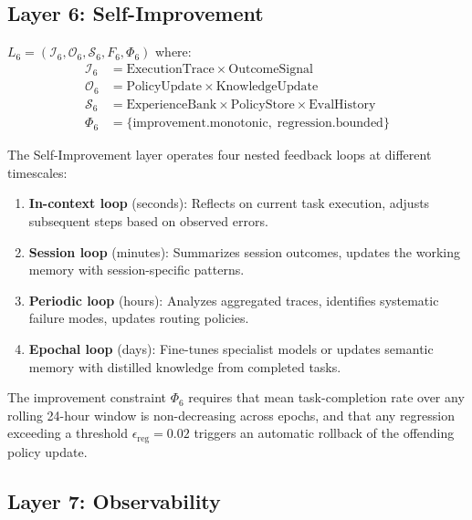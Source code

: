 \subsection{Layer 6: Self-Improvement}

\begin{definition}
    $L_6 = \left(\mathcal{I}_6, \mathcal{O}_6, \mathcal{S}_6, F_6, \Phi_6\right)$ where:
    \begin{align*}
        \mathcal{I}_6 &= \text{ExecutionTrace} \times \text{OutcomeSignal} \\
        \mathcal{O}_6 &= \text{PolicyUpdate} \times \text{KnowledgeUpdate} \\
        \mathcal{S}_6 &= \text{ExperienceBank} \times \text{PolicyStore} \times
                         \text{EvalHistory} \\
        \Phi_6 &= \{\text{improvement.monotonic},\;
                    \text{regression.bounded}\}
    \end{align*}
\end{definition}

The Self-Improvement layer operates four nested feedback loops at different
timescales:

\begin{enumerate}[leftmargin=1.5em]
    \item \textbf{In-context loop} (seconds): Reflects on current task
          execution, adjusts subsequent steps based on observed errors.
    \item \textbf{Session loop} (minutes): Summarizes session outcomes,
          updates the working memory with session-specific patterns.
    \item \textbf{Periodic loop} (hours): Analyzes aggregated traces,
          identifies systematic failure modes, updates routing policies.
    \item \textbf{Epochal loop} (days): Fine-tunes specialist models or
          updates semantic memory with distilled knowledge from completed tasks.
\end{enumerate}

The improvement constraint $\Phi_6$ requires that mean task-completion rate
over any rolling 24-hour window is non-decreasing across epochs, and that any
regression exceeding a threshold $\epsilon_{\text{reg}} = 0.02$ triggers an
automatic rollback of the offending policy update.

\subsection{Layer 7: Observability}

